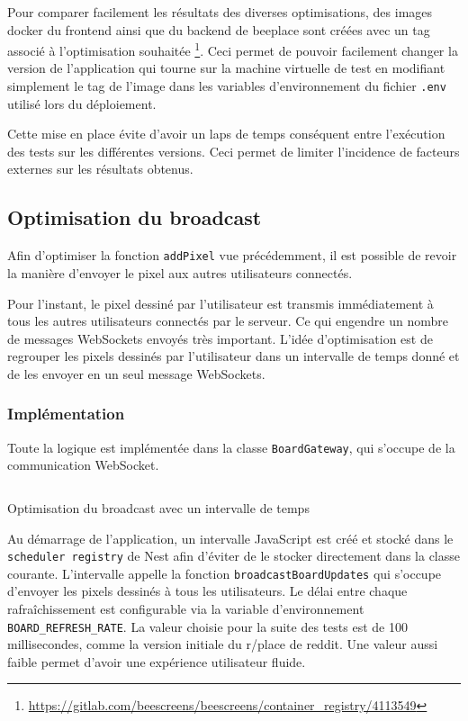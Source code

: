 Pour comparer facilement les résultats des diverses optimisations, des images \gls{docker} du frontend ainsi que du backend de \gls{beeplace} sont créées avec un tag associé à l'optimisation souhaitée \footnote{\url{https://gitlab.com/beescreens/beescreens/container_registry/4113549}}. Ceci permet de pouvoir facilement changer la version de l'application qui tourne sur la machine virtuelle de test en modifiant simplement le tag de l'image dans les variables d'environnement du fichier \texttt{.env} utilisé lors du déploiement.

Cette mise en place évite d'avoir un laps de temps conséquent entre l'exécution des tests sur les différentes versions. Ceci permet de limiter l'incidence de facteurs externes sur les résultats obtenus.

\subsection{Optimisation du broadcast}

Afin d'optimiser la fonction \texttt{addPixel} vue précédemment, il est possible de revoir la manière d'envoyer le pixel aux autres utilisateurs connectés.

Pour l'instant, le pixel dessiné par l'utilisateur est transmis immédiatement à tous les autres utilisateurs connectés par le serveur. Ce qui engendre un nombre de messages WebSockets envoyés très important. L'idée d'optimisation est de regrouper les pixels dessinés par l'utilisateur dans un intervalle de temps donné et de les envoyer en un seul message WebSockets.

\subsubsection{Implémentation}

Toute la logique est implémentée dans la classe \texttt{BoardGateway}, qui s'occupe de la communication WebSocket.

\begin{listing}[H]
  \inputminted[highlightlines={3,12,18,19,29},linenos]{ts}{assets/figures/opti-interval.ts}
  \caption{Optimisation du broadcast avec un intervalle de temps}
  \label{listing:opti-interval}
\end{listing}

Au démarrage de l'application, un intervalle JavaScript est créé et stocké dans le \texttt{scheduler registry} de Nest afin d'éviter de le stocker directement dans la classe courante. L'intervalle appelle la fonction \texttt{broadcastBoardUpdates} qui s'occupe d'envoyer les pixels dessinés à tous les utilisateurs. Le délai entre chaque rafraîchissement est configurable via la variable d'environnement \texttt{BOARD\_REFRESH\_RATE}. La valeur choisie pour la suite des tests est de 100 millisecondes, comme la version initiale du r/place de \gls{reddit}. Une valeur aussi faible permet d'avoir une expérience utilisateur fluide.

